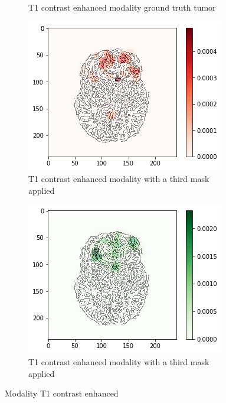 \begin{figure}[H]
\begin{subfigure}[t]{.4\textwidth}
        \caption{T1 contrast enhanced modality ground truth tumor}
    \end{subfigure}
    \begin{subfigure}[t]{.45\textwidth}
        \centering
        \includegraphics[width=\linewidth]{chapters/06_hdm/c_Brats18_2013_17_1_L1/48.png}
        \caption{T1 contrast enhanced modality with a third mask applied}
    \end{subfigure}\hspace{1cm}%
    \begin{subfigure}[t]{.45\textwidth}
        \centering
        \includegraphics[width=\linewidth]{chapters/06_hdm/c_Brats18_2013_17_1_L1/49.png}
        \caption{T1 contrast enhanced modality with a third mask applied}
    \end{subfigure}
    \caption{Modality T1 contrast enhanced}
\end{figure}

